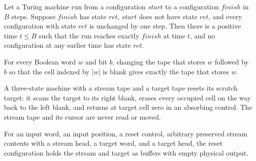 \begin{lemma}
\label{Complexity.clFirst}
\leanok
{}
Let a Turing machine run from a configuration $start$ to a configuration $finish$ in $B$
steps. Suppose $finish$ has state $ret$, $start$ does not have state $ret$, and every
configuration with state $ret$ is unchanged by one step. Then there is a positive time
$t\le B$ such that the run reaches exactly $finish$ at time $t$, and no configuration at
any earlier time has state $ret$.
\end{lemma}

\begin{lemma}
\label{Complexity.clErase_last}
\leanok
{}
For every Boolean word $w$ and bit $b$, changing the tape that stores $w$ followed by
$b$ so that the cell indexed by $|w|$ is blank gives exactly the tape that stores $w$.
\end{lemma}

\begin{definition}
\label{Complexity.clWipeTM}
\leanok
{}
A three-state machine with a stream tape and a target tape resets its scratch target: it scans the target to its right blank, erases every occupied cell on the way back to the left blank, and returns at target cell zero in an absorbing control. The stream tape and its cursor are never read or moved.
\end{definition}

\begin{definition}
\label{Complexity.clWipeCfg}
\leanok
{}
For an input word, an input position, a reset control, arbitrary preserved stream contents with a stream head, a target word, and a target head, the reset configuration holds the stream and target as buffers with empty physical output.
\end{definition}

